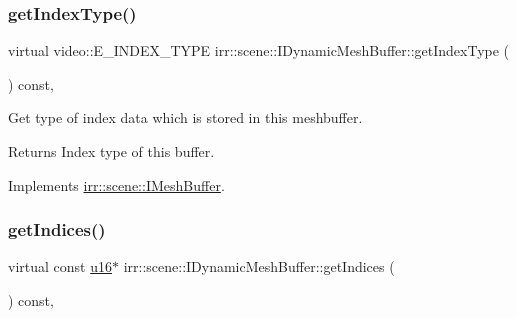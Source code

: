 \mbox{\label{classirr_1_1scene_1_1IDynamicMeshBuffer_a3ac73aed8c40103682c5c6388339e70d}} 
\subsubsection{\texorpdfstring{get\+Index\+Type()}{getIndexType()}}
{\footnotesize\ttfamily virtual video\+::\+E\+\_\+\+I\+N\+D\+E\+X\+\_\+\+T\+Y\+PE irr\+::scene\+::\+I\+Dynamic\+Mesh\+Buffer\+::get\+Index\+Type (\begin{DoxyParamCaption}{ }\end{DoxyParamCaption}) const\hspace{0.3cm}{\ttfamily [inline]}, {\ttfamily [virtual]}}



Get type of index data which is stored in this meshbuffer. 

\begin{DoxyReturn}{Returns}
Index type of this buffer. 
\end{DoxyReturn}


Implements \hyperlink{classirr_1_1scene_1_1IMeshBuffer_a8a993431c2c35420b62a577dc18dbdc2}{irr\+::scene\+::\+I\+Mesh\+Buffer}.

\mbox{\label{classirr_1_1scene_1_1IDynamicMeshBuffer_ab762d23eb5666125dad83ce20f15b4dd}} 
\subsubsection{\texorpdfstring{get\+Indices()}{getIndices()}\hspace{0.1cm}{\footnotesize\ttfamily [1/2]}}
{\footnotesize\ttfamily virtual const \hyperlink{namespaceirr_ae9f8ec82692ad3b83c21f555bfa70bcc}{u16}$\ast$ irr\+::scene\+::\+I\+Dynamic\+Mesh\+Buffer\+::get\+Indices (\begin{DoxyParamCaption}{ }\end{DoxyParamCaption}) const\hspace{0.3cm}{\ttfamily [inline]}, {\ttfamily [virtual]}}



